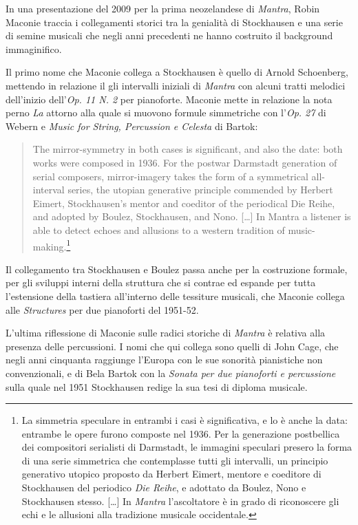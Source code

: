 \begin{multicols}{2}

In una presentazione del 2009 per la prima neozelandese di \emph{Mantra}, Robin Maconie traccia i collegamenti storici tra la genialità di Stockhausen e una serie di semine musicali che negli anni precedenti ne hanno costruito il background immaginifico.

Il primo nome che Maconie collega a Stockhausen è quello di Arnold Schoenberg, mettendo in relazione il gli intervalli iniziali di \emph{Mantra} con alcuni tratti melodici dell'inizio dell'\emph{Op. 11 N. 2} per pianoforte. Maconie mette in relazione la nota perno \emph{La} attorno alla quale si muovono formule simmetriche con l'\emph{Op. 27} di Webern e \emph{Music for String, Percussion e Celesta} di Bartok:

\begin{quote} The mirror-symmetry in both cases is significant, and also the date: both works were composed in 1936. For the postwar Darmstadt generation of serial composers, mirror-imagery takes the form of a symmetrical all-interval series, the utopian generative principle commended by Herbert Eimert, Stockhausen's mentor and coeditor of the periodical Die Reihe, and adopted by Boulez, Stockhausen, and Nono. [\ldots] In Mantra a listener is able to detect echoes and allusions to a western tradition of music-making.\footnote{La simmetria speculare in entrambi i casi è significativa, e lo è anche la data: entrambe le opere furono composte nel 1936. Per la generazione postbellica dei compositori serialisti di Darmstadt, le immagini speculari presero la forma di una serie simmetrica che contemplasse tutti gli intervalli, un principio generativo utopico proposto da Herbert Eimert, mentore e coeditore di Stockhausen del periodico \emph{Die Reihe}, e adottato da Boulez, Nono e Stockhausen stesso. [\ldots] In \emph{Mantra} l'ascoltatore è in grado di riconoscere gli echi e le allusioni alla tradizione musicale occidentale.}
\end{quote}

Il collegamento tra Stockhausen e Boulez passa anche per la costruzione formale, per gli sviluppi interni della struttura che si contrae ed espande per tutta l'estensione della tastiera all'interno delle tessiture musicali, che Maconie collega alle \emph{Structures} per due pianoforti del 1951-52.

L'ultima riflessione di Maconie sulle radici storiche di \emph{Mantra} è relativa alla presenza delle percussioni. I nomi che qui collega sono quelli di John Cage, che negli anni cinquanta raggiunge l'Europa con le sue sonorità pianistiche non convenzionali, e di Bela Bartok con la \emph{Sonata per due pianoforti e percussione} sulla quale nel 1951 Stockhausen redige la sua tesi di diploma musicale.



\end{multicols}
